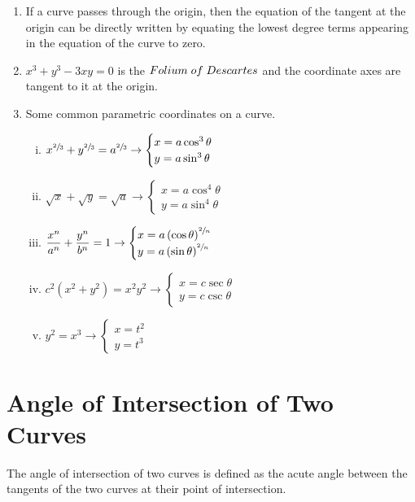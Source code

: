 \documentclass{article}
\begin{document}
\begin{enumerate}
    \item If a curve passes through the origin, then the equation of the tangent at the origin can be directly written by equating the lowest degree terms appearing in the equation of the curve to zero.
    \item $x^3+y^3-3xy=0$ is the $Folium \hspace{1mm} of \hspace{1mm} Descartes$ and the coordinate axes are tangent to it at the origin.
    \item Some common parametric coordinates on a curve.
          \begin{enumerate}[i.]
              \item $x^{\sfrac{2}{3}}+y^{\sfrac{2}{3}}=a^{\sfrac{2}{3}} \rightarrow \begin{cases}
                            x=a \cos^3 \theta \\ y=a \sin ^3 \theta
                        \end{cases}$
              \item $\sqrt{x}+\sqrt{y}=\sqrt{a} \rightarrow \begin{cases}
                            x=a \cos^4 \theta \\ y=a \sin ^4 \theta
                        \end{cases}$
              \item $\dfrac{x^n}{a^n}+\dfrac{y^n}{b^n}=1 \rightarrow \begin{cases}
                            x=a \left(\cos \theta\right)^{\sfrac{2}{n}} \\ y=a \left(\sin \theta\right)^{\sfrac{2}{n}}
                        \end{cases}$
              \item $c^2 \left(x^2+y^2\right)=x^2 y^2 \rightarrow \begin{cases}
                            x=c \sec \theta \\ y= c \csc \theta
                        \end{cases}$
              \item $y^2=x^3 \rightarrow \begin{cases}
                            x=t^2 \\ y=t^3
                        \end{cases}$
          \end{enumerate}
\end{enumerate}
\section{Angle of Intersection of Two Curves}
The angle of intersection of two curves is defined as the acute angle between the tangents of the two curves at their point of intersection.
\end{document}
